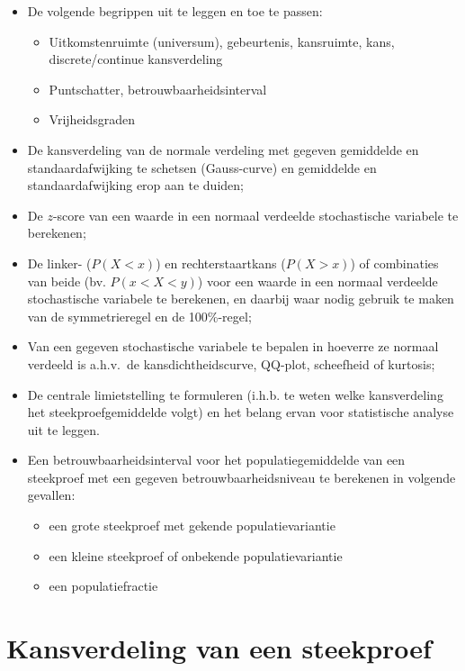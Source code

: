\begin{itemize}
  \item De volgende begrippen uit te leggen en toe te passen:
  \begin{itemize}
    \item Uitkomstenruimte (universum), gebeurtenis, kansruimte, kans, discrete/continue kansverdeling
    \item Puntschatter, betrouwbaarheidsinterval
    \item Vrijheidsgraden
  \end{itemize}
  \item De kansverdeling van de normale verdeling met gegeven gemiddelde en standaardafwijking te schetsen (Gauss-curve) en gemiddelde en standaardafwijking erop aan te duiden;
  \item De $z$-score van een waarde in een normaal verdeelde stochastische variabele te berekenen;
  \item De linker- ($P(X<x)$) en rechterstaartkans ($P(X>x)$) of combinaties van beide (bv. $P(x<X<y)$) voor een waarde in een normaal verdeelde stochastische variabele te berekenen, en daarbij waar nodig gebruik te maken van de symmetrieregel en de 100\%-regel;
  \item Van een gegeven stochastische variabele te bepalen in hoeverre ze normaal verdeeld is a.h.v.~de kansdichtheidscurve, QQ-plot, scheefheid of kurtosis;
  \item De centrale limietstelling te formuleren (i.h.b. te weten welke kansverdeling het steekproefgemiddelde volgt) en het belang ervan voor statistische analyse uit te leggen.
  \item Een betrouwbaarheidsinterval voor het populatiegemiddelde van een steekproef met een gegeven betrouwbaarheidsniveau te berekenen in volgende gevallen:
  \begin{itemize}
    \item een grote steekproef met gekende populatievariantie
    \item een kleine steekproef of onbekende populatievariantie
    \item een populatiefractie
  \end{itemize}
\end{itemize}

\section{Kansverdeling van een steekproef}
\label{sec:kansverdeling-steekproef}

